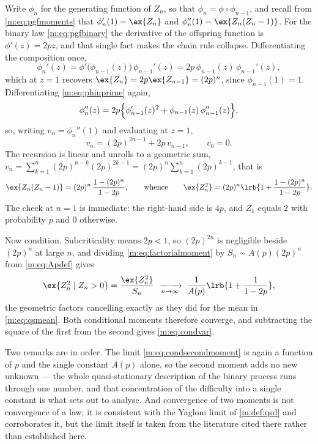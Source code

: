 Write $\phi_n$ for the generating function of $Z_n$, so that $\phi_n=\phi\circ
\phi_{n-1}$, and recall from \cref{m:eq:pgfmoments} that $\phi_n'(1)=\ex{Z_n}$ and
$\phi_n''(1)=\ex{Z_n(Z_n-1)}$. For the binary law \cref{m:eq:pgfbinary} the
derivative of the offspring function is $\phi'(z)=2pz$, and that single fact makes
the chain rule collapse. Differentiating the composition once,
\begin{equation}
\label{m:eq:phinprime}
\phi_n'(z) = \phi'\bigl(\phi_{n-1}(z)\bigr)\,\phi_{n-1}'(z)
= 2p\,\phi_{n-1}(z)\,\phi_{n-1}'(z),
\end{equation}
which at $z=1$ recovers $\ex{Z_n}=2p\ex{Z_{n-1}}=(2p)^n$, since $\phi_{n-1}(1)=1$.
Differentiating \cref{m:eq:phinprime} again,
\begin{equation}
\label{m:eq:phinsecond}
\phi_n''(z)
= 2p\Bigl\{\phi_{n-1}'(z)^2 + \phi_{n-1}(z)\,\phi_{n-1}''(z)\Bigr\},
\end{equation}
so, writing $v_n=\phi_n''(1)$ and evaluating at $z=1$,
\begin{equation}
\label{m:eq:vnrecursion}
v_n = (2p)^{2n-1} + 2p\,v_{n-1},
\qquad v_0 = 0 .
\end{equation}
The recursion is linear and unrolls to a geometric sum,
$v_n=\sum_{k=1}^{n}(2p)^{n-k}(2p)^{2k-1}=(2p)^n\sum_{k=1}^{n}(2p)^{k-1}$, that is
\begin{equation}
\label{m:eq:factorialmoment}
\ex{Z_n(Z_n-1)} = (2p)^n\,\frac{1-(2p)^n}{1-2p},
\qquad\text{whence}\qquad
\ex{Z_n^2} = (2p)^n\lrb{1+\frac{1-(2p)^n}{1-2p}} .
\end{equation}
The check at $n=1$ is immediate: the right-hand side is $4p$, and $Z_1$ equals
$2$ with probability $p$ and $0$ otherwise.

Now condition. Subcriticality means $2p<1$, so $(2p)^{2n}$ is negligible beside
$(2p)^n$ at large $n$, and dividing \cref{m:eq:factorialmoment} by
$S_n\sim A(p)(2p)^n$ from \cref{m:eq:Apdef} gives
\begin{equation}
\label{m:eq:condsecondmoment}
\ex{Z_n^2\mid Z_n>0}
= \frac{\ex{Z_n^2}}{S_n}
\;\xrightarrow[n\to\infty]{}\;
\frac{1}{A(p)}\lrb{1+\frac{1}{1-2p}} ,
\end{equation}
the geometric factors cancelling exactly as they did for the mean in
\cref{m:eq:qsmean}. Both conditional moments therefore converge, and subtracting the
square of the first from the second gives \cref{m:eq:condvar}.

Two remarks are in order. The limit \cref{m:eq:condsecondmoment} is again a function
of $p$ and the single constant $A(p)$ alone, so the second moment adds no new
unknown --- the whole quasi-stationary description of the binary process runs
through one number, and that concentration of the difficulty into a single constant
is what \ChA{} sets out to analyse. And convergence of
two moments is not convergence of a law; it is consistent with the Yaglom limit of
\cref{m:def:qsd} and corroborates it, but the limit itself is taken from the
literature cited there rather than established here.

